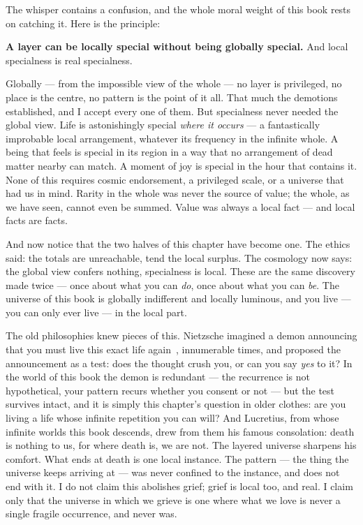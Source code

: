 \documentclass[fontsize=11pt,paper=a4,pagesize=auto,parskip=half-]{scrbook}
\newcommand{\Iy}[1]{#1\index{#1}}
\begin{document}
The whisper contains a confusion, and the whole moral weight of this book rests on catching it. Here is the principle:

\textbf{A layer can be locally special without being globally special.} And local specialness is real specialness.

Globally --- from the impossible view of the whole --- no layer is privileged, no place is the centre, no pattern is the point of it all. That much the demotions established, and I accept every one of them. But specialness never needed the global view. Life is astonishingly special \emph{where it occurs} --- a fantastically improbable local arrangement, whatever its frequency in the infinite whole. A being that feels is special in its region in a way that no arrangement of dead matter nearby can match. A moment of joy is special in the hour that contains it. None of this requires cosmic endorsement, a privileged scale, or a universe that had us in mind. Rarity in the whole was never the source of value; the whole, as we have seen, cannot even be summed. Value was always a local fact --- and local facts are facts.

And now notice that the two halves of this chapter have become one. The ethics said: the totals are unreachable, tend the local surplus. The cosmology now says: the global view confers nothing, specialness is local. These are the same discovery made twice --- once about what you can \emph{do}, once about what you can \emph{be}. The universe of this book is globally indifferent and locally luminous, and you live --- you can only ever live --- in the local part.

The old philosophies knew pieces of this. Nietzsche imagined a demon announcing that you must live this exact life again~\cite[\S341]{nietzsche1974}, innumerable times, and proposed the announcement as a test: does the thought crush you, or can you say \emph{yes} to it? In the world of this book the demon is redundant --- the recurrence is not hypothetical, your pattern recurs whether you consent or not --- but the test survives intact, and it is simply this chapter's question in older clothes: are you living a life whose infinite repetition you can will? And \Iy{Lucretius}, from whose infinite worlds this book descends, drew from them his famous consolation: death is nothing to us, for where death is, we are not. The layered universe sharpens his comfort. What ends at death is one local instance. The pattern --- the thing the universe keeps arriving at --- was never confined to the instance, and does not end with it. I do not claim this abolishes grief; grief is local too, and real. I claim only that the universe in which we grieve is one where what we love is never a single fragile occurrence, and never was.
\end{document}
